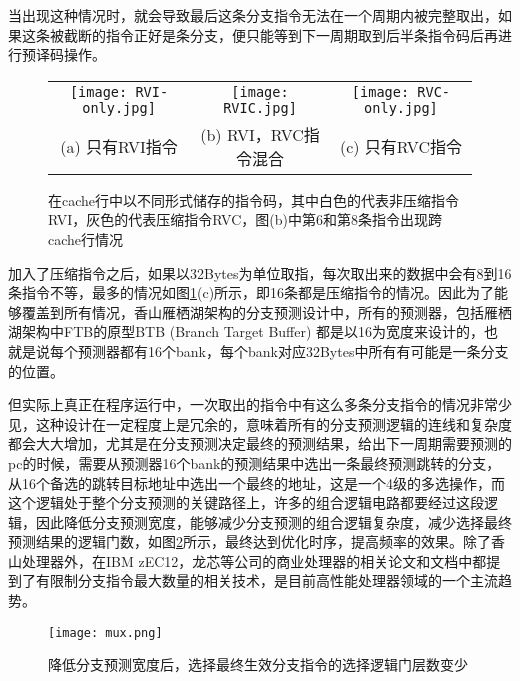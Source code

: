 当出现这种情况时，就会导致最后这条分支指令无法在一个周期内被完整取出，如果这条被截断的指令正好是条分支，便只能等到下一周期取到后半条指令码后再进行预译码操作。

\begin{figure}[htb]
    \centering
    \setlength\tabcolsep{3pt}  %
    \vspace{5pt} %
    \begin{tabular}{ccc}
        \texttt{[image: RVI-only.jpg]} &
        \texttt{[image: RVIC.jpg]} &
        \texttt{[image: RVC-only.jpg]} \\
        (a) 只有RVI指令 & (b) RVI，RVC指令混合 & (c) 只有RVC指令 \\[1ex]
    \end{tabular}
    \caption{在cache行中以不同形式储存的指令码，其中白色的代表非压缩指令RVI，灰色的代表压缩指令RVC，图(b)中第6和第8条指令出现跨cache行情况}
    \label{fig:figure31}
\end{figure}

加入了压缩指令之后，如果以32Bytes为单位取指，每次取出来的数据中会有8到16条指令不等，最多的情况如图\ref{fig:figure31}(c)所示，即16条都是压缩指令的情况。因此为了能够覆盖到所有情况，香山雁栖湖架构的分支预测设计中，所有的预测器，包括雁栖湖架构中FTB的原型BTB (Branch Target Buffer) 都是以16为宽度来设计的，也就是说每个预测器都有16个bank，每个bank对应32Bytes中所有有可能是一条分支的位置。

但实际上真正在程序运行中，一次取出的指令中有这么多条分支指令的情况非常少见，这种设计在一定程度上是冗余的，意味着所有的分支预测逻辑的连线和复杂度都会大大增加，尤其是在分支预测决定最终的预测结果，给出下一周期需要预测的pc的时候，需要从预测器16个bank的预测结果中选出一条最终预测跳转的分支，从16个备选的跳转目标地址中选出一个最终的地址，这是一个4级的多选操作，而这个逻辑处于整个分支预测的关键路径上，许多的组合逻辑电路都要经过这段逻辑，因此降低分支预测宽度，能够减少分支预测的组合逻辑复杂度，减少选择最终预测结果的逻辑门数，如图\ref{fig:figure33}所示，最终达到优化时序，提高频率的效果。除了香山处理器外，在IBM zEC12\cite{ibm-zec12}，龙芯\cite{loongson}等公司的商业处理器的相关论文和文档中都提到了有限制分支指令最大数量的相关技术，是目前高性能处理器领域的一个主流趋势。

\begin{figure}[htb]
	\centering
	\setlength\tabcolsep{3pt}  %
	\vspace{5pt} %
	\texttt{[image: mux.png]}
	\caption{降低分支预测宽度后，选择最终生效分支指令的选择逻辑门层数变少}
	\label{fig:figure33}
\end{figure}

